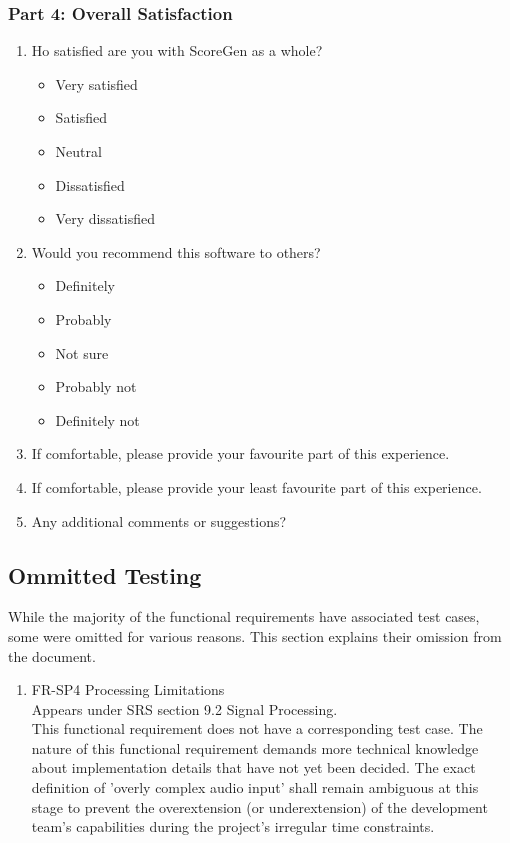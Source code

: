 \documentclass[12pt, titlepage]{article}
\begin{document}
\subsubsection*{Part 4: Overall Satisfaction}
\begin{enumerate}[resume, leftmargin=*]
  \item Ho satisfied are you with ScoreGen as a whole?
  \begin{itemize}
    \item Very satisfied
    \item Satisfied
    \item Neutral
    \item Dissatisfied
    \item Very dissatisfied
  \end{itemize}
  \item Would you recommend this software to others?
  \begin{itemize}
    \item Definitely
    \item Probably
    \item Not sure
    \item Probably not
    \item Definitely not
  \end{itemize}
  \item If comfortable, please provide your favourite part of this experience.
  
  \vspace{5pt}
  \hrulefill
  \item If comfortable, please provide your least favourite part of this experience.
  
  \vspace{5pt}
  \hrulefill
  \item Any additional comments or suggestions?
  
  \vspace{5pt}
  \hrulefill
\end{enumerate}
\subsection{Ommitted Testing}
While the majority of the functional requirements have associated test cases, 
some were omitted for various reasons. This section explains their omission from the document. 
\begin{enumerate}
  \item FR-SP4 Processing Limitations \\
  Appears under SRS section 9.2 Signal Processing. \\
  This functional requirement does not
  have a corresponding test case. The nature of this functional requirement demands more technical knowledge
  about implementation details that have not yet been decided. The exact definition of 'overly complex audio input' shall
  remain ambiguous at this stage to prevent the overextension (or underextension) of the development team's
  capabilities during the project's irregular time constraints.
\end{enumerate}
\end{document}
